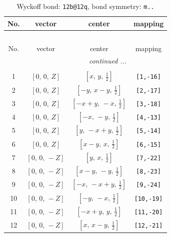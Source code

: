 \documentclass[fleqn,8pt]{jsarticle}
\begin{document}
\renewcommand{\arraystretch}{1.2}
\begin{longtable}{cccc}
\caption{Wyckoff bond: {\tt 12b@12q}, bond symmetry: {\tt m..}}
 \\
 \hline \hline
No. & vector & center & mapping \\ \hline \endfirsthead

\multicolumn{3}{l}{\tablename\ \thetable{}} \\
 \hline \hline
No. & vector & center & mapping \\ \hline \endhead

 \hline \hline
\multicolumn{3}{r}{\footnotesize\it continued ...} \\ \endfoot

 \hline \hline
\multicolumn{3}{r}{} \\ \endlastfoot

1 & $\left[ 0,\, 0,\, Z \right]$ & $\left[ x,\, y,\, \frac{1}{2} \right]$ & {\tt [1,-16]} \\ \hline
2 & $\left[ 0,\, 0,\, Z \right]$ & $\left[ - y,\, x - y,\, \frac{1}{2} \right]$ & {\tt [2,-17]} \\ \hline
3 & $\left[ 0,\, 0,\, Z \right]$ & $\left[ - x + y,\, - x,\, \frac{1}{2} \right]$ & {\tt [3,-18]} \\ \hline
4 & $\left[ 0,\, 0,\, Z \right]$ & $\left[ - x,\, - y,\, \frac{1}{2} \right]$ & {\tt [4,-13]} \\ \hline
5 & $\left[ 0,\, 0,\, Z \right]$ & $\left[ y,\, - x + y,\, \frac{1}{2} \right]$ & {\tt [5,-14]} \\ \hline
6 & $\left[ 0,\, 0,\, Z \right]$ & $\left[ x - y,\, x,\, \frac{1}{2} \right]$ & {\tt [6,-15]} \\ \hline
7 & $\left[ 0,\, 0,\, - Z \right]$ & $\left[ y,\, x,\, \frac{1}{2} \right]$ & {\tt [7,-22]} \\ \hline
8 & $\left[ 0,\, 0,\, - Z \right]$ & $\left[ x - y,\, - y,\, \frac{1}{2} \right]$ & {\tt [8,-23]} \\ \hline
9 & $\left[ 0,\, 0,\, - Z \right]$ & $\left[ - x,\, - x + y,\, \frac{1}{2} \right]$ & {\tt [9,-24]} \\ \hline
10 & $\left[ 0,\, 0,\, - Z \right]$ & $\left[ - y,\, - x,\, \frac{1}{2} \right]$ & {\tt [10,-19]} \\ \hline
11 & $\left[ 0,\, 0,\, - Z \right]$ & $\left[ - x + y,\, y,\, \frac{1}{2} \right]$ & {\tt [11,-20]} \\ \hline
12 & $\left[ 0,\, 0,\, - Z \right]$ & $\left[ x,\, x - y,\, \frac{1}{2} \right]$ & {\tt [12,-21]} \\
\end{longtable}
\end{document}
